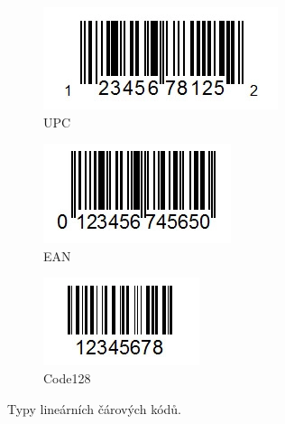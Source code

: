 \begin{figure}[h]\centering
    \centering
    \begin{subfigure}{0.3\textwidth}
    \includegraphics[width=0.9\linewidth]{obrazky-figures/UPC.png}\hfill
    \caption{UPC}
    \end{subfigure}
    \begin{subfigure}{0.3\textwidth}
    \includegraphics[width=0.9\linewidth]{obrazky-figures/EAN.png}\hfill
    \caption{EAN}
    \end{subfigure}
    \begin{subfigure}{0.3\textwidth}
    \includegraphics[width=0.9\linewidth]{obrazky-figures/code128.png}\hfill
    \caption{Code128}
    \end{subfigure}
    \caption{Typy lineárních čárových kódů\protect\footnotemark{}.}
    \label{lin_barcodes}
\end{figure}
\newpage
